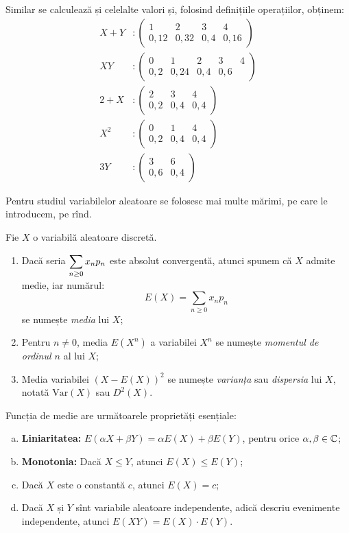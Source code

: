 Similar se calculează și celelalte valori și, folosind definițiile operațiilor,
obținem:
\begin{align*}
  X + Y &: \begin{pmatrix} 1 & 2 & 3 & 4 \\ 0,12 & 0,32 & 0,4 & 0,16 \end{pmatrix} \\
  XY &: \begin{pmatrix} 0 & 1 & 2 & 3 & 4 \\ 0,2 & 0,24 & 0,4 & 0,6 \end{pmatrix} \\
  2 + X &: \begin{pmatrix} 2 & 3 & 4 \\ 0,2 & 0,4 & 0,4 \end{pmatrix} \\
  X^2 &: \begin{pmatrix} 0 & 1 & 4 \\ 0,2 & 0,4 & 0,4 \end{pmatrix} \\
  3Y &: \begin{pmatrix} 3 & 6 \\ 0,6 & 0,4 \end{pmatrix}
\end{align*}

\vspace{0.3cm}


Pentru studiul variabilelor aleatoare se folosesc mai multe mărimi, pe care le introducem,
pe rînd.

\begin{definition}\label{def:medie-mom-var}
  Fie $ X $ o variabilă aleatoare discretă.
  \begin{enumerate}[(1)]
  \item Dacă seria $ \displaystyle\sum_{n \geq 0} x_n p_n $ este absolut convergentă, atunci spunem că $ X $
    admite medie, iar numărul:
    \[
      E(X) = \sum_{n \geq 0} x_n p_n
    \]
    se numește \emph{media} lui $ X $;
  \item Pentru $ n \neq 0 $, media $ E(X^n) $ a variabilei $ X^n $ se numește \emph{momentul %
      de ordinul $ n $} al lui $ X $;
  \item Media variabilei $ (X - E(X))^2 $ se numește \emph{varianța} sau \emph{dispersia}
    lui $ X $, notată $ \mathrm{Var}(X) $ sau $ D^2(X) $.
  \end{enumerate}
\end{definition}

Funcția de medie are următoarele proprietăți esențiale:
\begin{enumerate}[(a)]
\item \textbf{Liniaritatea:} $ E(\alpha X + \beta Y) = \alpha E(X) + \beta E(Y) $, pentru
  orice $ \alpha, \beta \in \mathbb{C} $;
\item \textbf{Monotonia:} Dacă $ X \leq Y $, atunci $ E(X) \leq E(Y) $;
\item Dacă $ X $ este o constantă $ c $, atunci $ E(X) = c $;
\item Dacă $ X $ și $ Y $ sînt variabile aleatoare independente, adică descriu evenimente
  independente, atunci $ E(XY) = E(X) \cdot E(Y) $.
\end{enumerate}

